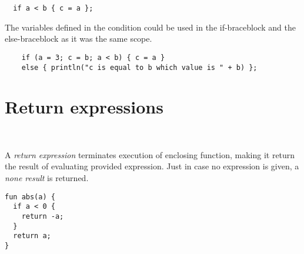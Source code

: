 \begin{example}
\begin{lstlisting}
  if a < b { c = a };
\end{lstlisting}
\end{example}

The variables defined in the condition could be used in the if-braceblock and the else-braceblock as it was the same scope.

\begin{example}[If expression]
  \begin{lstlisting}
    if (a = 3; c = b; a < b) { c = a } 
    else { println("c is equal to b which value is " + b) };
  \end{lstlisting}
\end{example}

\section{Return expressions}

\begin{bnf}
   \eq {} \ 
\end{bnf}

A \emph{return expression} terminates execution of enclosing function, making it return the result of evaluating provided expression. Just in case no expression is given, a \emph{none result} is returned.

\begin{example}
\begin{lstlisting}
fun abs(a) {
  if a < 0 {
    return -a;
  }
  return a;
}
\end{lstlisting}
\end{example}
